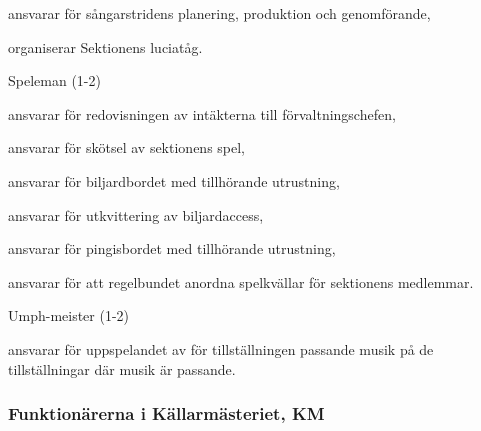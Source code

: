 \documentclass[10pt]{article}
\begin{document}
\begin{emptylist}
        \begin{dashlist}
            \item ansvarar för sångarstridens planering, produktion och
                genomförande,
            \item organiserar Sektionens luciatåg.
        \end{dashlist}
    \item Speleman (1-2)
        \begin{dashlist}
            \item ansvarar för redovisningen av intäkterna till
                förvaltningschefen,
            \item ansvarar för skötsel av sektionens spel,
            \item ansvarar för biljardbordet med tillhörande utrustning,
            \item ansvarar för utkvittering av biljardaccess,
            \item ansvarar för pingisbordet med tillhörande utrustning,
            \item ansvarar för att regelbundet anordna spelkvällar för sektionens medlemmar.
        \end{dashlist}
    \item Umph-meister (1-2)
        \begin{dashlist}
        \item ansvarar för uppspelandet av för tillställningen passande
            musik på de tillställningar där musik är passande.
        \end{dashlist}
\end{emptylist}

\subsubsection{Funktionärerna i Källarmästeriet, KM}
\end{document}
